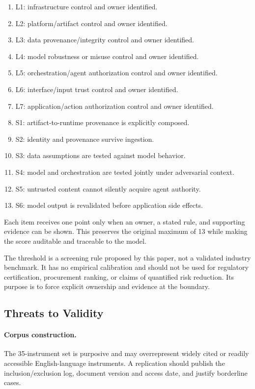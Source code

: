 \documentclass[runningheads]{llncs}
\begin{document}
\begin{enumerate}
\item L1: infrastructure control and owner identified.
\item L2: platform/artifact control and owner identified.
\item L3: data provenance/integrity control and owner identified.
\item L4: model robustness or misuse control and owner identified.
\item L5: orchestration/agent authorization control and owner identified.
\item L6: interface/input trust control and owner identified.
\item L7: application/action authorization control and owner identified.
\item S1: artifact-to-runtime provenance is explicitly composed.
\item S2: identity and provenance survive ingestion.
\item S3: data assumptions are tested against model behavior.
\item S4: model and orchestration are tested jointly under adversarial context.
\item S5: untrusted content cannot silently acquire agent authority.
\item S6: model output is revalidated before application side effects.
\end{enumerate}

Each item receives one point only when an owner, a stated rule, and supporting evidence can be shown. This preserves the original maximum of 13 while making the score auditable and traceable to the model.

The threshold is a screening rule proposed by this paper, not a validated industry benchmark. It has no empirical calibration and should not be used for regulatory certification, procurement ranking, or claims of quantified risk reduction. Its purpose is to force explicit ownership and evidence at the boundary.

\subsection{Threats to Validity}

\paragraph{Corpus construction.}
The 35-instrument set is purposive and may overrepresent widely cited or readily accessible English-language instruments. A replication should publish the inclusion/exclusion log, document version and access date, and justify borderline cases.
\end{document}
